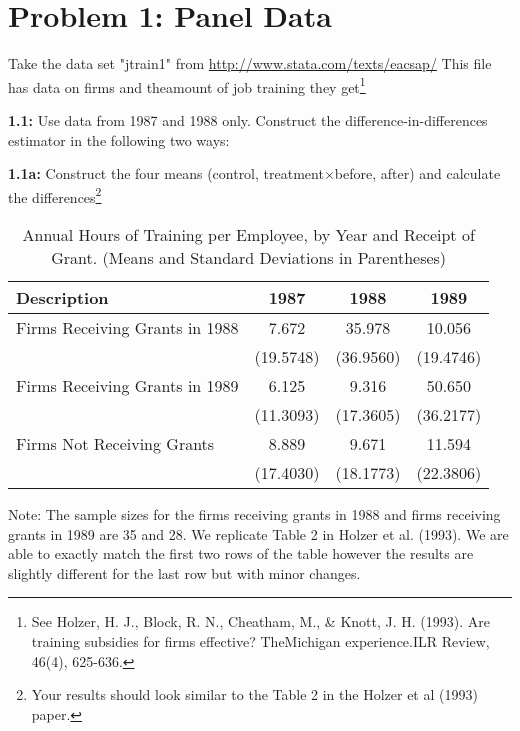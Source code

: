 \documentclass[a4paper]{article}
\title{}
\author{Problem Set IV - Difference-in-Difference\\
	\small{\emph{Enrijeta Shino}}}
\begin{document}
	\maketitle

\section{Problem 1: Panel Data}

Take the data set "jtrain1" from \url{http://www.stata.com/texts/eacsap/} This file has data on firms and theamount of job training they get\footnote{See Holzer, H. J., Block, R. N., Cheatham, M., \& Knott, J. H. (1993).  Are training subsidies for firms effective?  TheMichigan experience.ILR Review, 46(4), 625-636.}

\noindent \textbf{1.1:} Use data from 1987 and 1988 only. Construct the difference-in-differences estimator in the following two ways:

\textbf{1.1a:} Construct the four means (control, treatment$\times$before, after) and calculate the differences\footnote{Your results should look similar to the Table 2 in the Holzer et al (1993) paper.}
\vspace{0.5cm}


\begin{table}[]
		\begin{center}
	\begin{adjustbox}{angle=90}
\begin{threeparttable}
	\centering
	\caption{Annual Hours of Training per Employee, by Year and Receipt of Grant. (Means and Standard Deviations in Parentheses)}
	\begin{tabular}{l@{\hskip 0.7in}c@{\hskip 0.7in}c@{\hskip 0.7in}c}
		\hline
		Description & 1987 & 1988 & 1989 \\
		\hline
		Firms Receiving Grants in 1988 & 7.672 & 35.978 & 10.056 \\
		& (19.5748) & (36.9560) &(19.4746)\\
		Firms Receiving Grants in 1989 &  6.125 &  9.316 & 50.650\\
		& (11.3093) & (17.3605)& (36.2177)\\
		Firms Not Receiving Grants & 8.889 &   9.671 & 11.594\\
		& (17.4030) & (18.1773) & (22.3806) \\
		\hline
	\end{tabular}
	 \begin{tablenotes}
		\small
		\item Note: The sample sizes for the firms receiving grants in 1988 and firms receiving grants in 1989 are 35 and 28. We replicate Table 2 in Holzer et al. (1993). We are able to exactly match the first two rows of the table however the results are slightly different for the last row but with minor changes. 
	\end{tablenotes}
\end{threeparttable}
	\end{adjustbox}
\end{center}
		\end{table}
\end{document}
